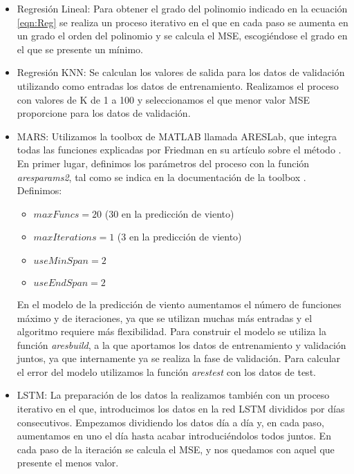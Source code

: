 \documentclass[journal]{IEEEtran}
\begin{document}
\begin{itemize}
    \item Regresión Lineal: Para obtener el grado del polinomio indicado en la ecuación \ref{eqn:Reg} se realiza un proceso iterativo en el que en cada paso se aumenta en un grado el orden del polinomio y se calcula el MSE, escogiéndose el grado en el que se presente un mínimo. 

    \item Regresión KNN: Se calculan los valores de salida para los datos de validación utilizando como entradas los datos de entrenamiento. Realizamos el proceso con valores de K de 1 a 100 y seleccionamos el que menor valor MSE proporcione para los datos de validación.
    \item MARS: Utilizamos la toolbox de MATLAB llamada ARESLab, que integra todas las funciones explicadas por Friedman en su artículo sobre el método \cite{JHFRIEDMAN1991}. En primer lugar, definimos los parámetros del proceso con la función \emph{aresparams2}, tal como se indica en la documentación de la toolbox \cite{ARESLAB2016}. Definimos:
    \begin{itemize}
        \item $maxFuncs = 20$ ($30$ en la predicción de viento)
        \item $maxIterations = 1$ ($3$ en la predicción de viento)
        \item $useMinSpan = 2$
        \item $useEndSpan = 2$
    \end{itemize}
    En el modelo de la predicción de viento aumentamos el número de funciones máximo y de iteraciones, ya que se utilizan muchas más entradas y el algoritmo requiere más flexibilidad.
    Para construir el modelo se utiliza la función \emph{aresbuild}, a la que aportamos los datos de entrenamiento y validación juntos, ya que internamente ya se realiza la fase de validación.
    Para calcular el error del modelo utilizamos la función \emph{arestest} con los datos de test.
    \item LSTM: La preparación de los datos la realizamos también con un proceso iterativo en el que, introducimos los datos en la red LSTM divididos por días consecutivos. Empezamos dividiendo los datos día a día y, en cada paso, aumentamos en uno el día hasta acabar  introduciéndolos todos juntos. En cada paso de la iteración  se calcula el MSE, y nos quedamos con aquel que presente el menos valor.

\end{itemize}
\end{document}
